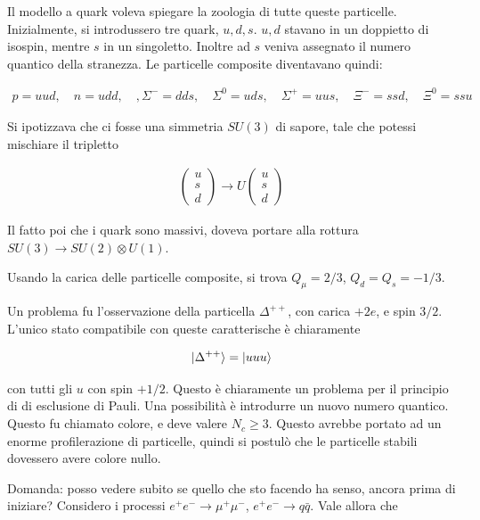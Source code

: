 \documentclass[11pt]{report}
\begin{document}
Il modello a quark voleva spiegare la zoologia di tutte queste particelle. Inizialmente, si introdussero tre quark, \(u, d, s\). \(u, d\) stavano in un doppietto di isospin, mentre \(s\) in un singoletto. Inoltre ad \(s\) veniva assegnato il numero quantico della stranezza. Le particelle composite diventavano quindi: 

\begin{align}
    p = uud, \quad n = udd, \quad, \Sigma^- = dds, \quad \Sigma^0 = uds, \quad \Sigma^+ = uus, \quad \Xi^- = ssd, \quad \Xi^0 = ssu 
\end{align}

Si ipotizzava che ci fosse una simmetria \(SU(3)\) di sapore, tale che potessi mischiare il tripletto 

\begin{align}
    \begin{pmatrix}
        u \\ s \\ d 
    \end{pmatrix} \to U \begin{pmatrix}
        u \\ s \\ d 
    \end{pmatrix}
\end{align}

Il fatto poi che i quark sono massivi, doveva portare alla rottura \(SU(3)\to SU(2) \otimes U(1)\). 

Usando la carica delle particelle composite, si trova \(Q_\mu = 2/3\), \(Q_d = Q_s = -1/3\). 

Un problema fu l'osservazione della particella \(\Delta^{++}\), con carica \(+2e\), e spin \(3/2\). L'unico stato compatibile con queste caratterische è chiaramente 

\begin{align}
    \ket{\Delta^{++}} = \ket{uuu}
\end{align}

con tutti gli \(u\) con spin \(+1/2\). Questo è chiaramente un problema per il principio di di esclusione di Pauli. Una possibilità è introdurre un nuovo numero quantico. Questo fu chiamato colore, e deve valere \(N_c \geq 3\). Questo avrebbe portato ad un enorme profilerazione di particelle, quindi si postulò che le particelle stabili dovessero avere colore nullo. 

Domanda: posso vedere subito se quello che sto facendo ha senso, ancora prima di iniziare? Considero i processi \(e^+e^- \to \mu^+\mu^-\), \(e^+e^- \to q \bar{q}\). Vale allora che 
\end{document}
